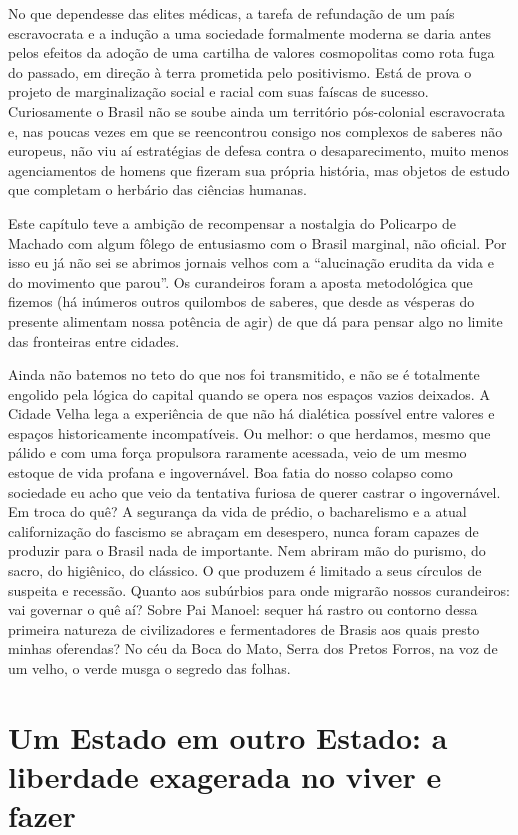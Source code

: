 No que dependesse das elites médicas, a tarefa de refundação de um país
escravocrata e a indução a uma sociedade formalmente moderna se daria
antes pelos efeitos da adoção de uma cartilha de valores cosmopolitas
como rota fuga do passado, em direção à terra prometida pelo
positivismo. Está de prova o projeto de marginalização social e racial
com suas faíscas de sucesso. Curiosamente o Brasil não se soube ainda um
território pós-colonial escravocrata e, nas poucas vezes em que se
reencontrou consigo nos complexos de saberes não europeus, não viu aí
estratégias de defesa contra o desaparecimento, muito menos
agenciamentos de homens que fizeram sua própria história, mas objetos de
estudo que completam o herbário das ciências humanas.

Este capítulo teve a ambição de recompensar a nostalgia do Policarpo de
Machado com algum fôlego de entusiasmo com o Brasil marginal, não
oficial. Por isso eu já não sei se abrimos jornais velhos com a
``alucinação erudita da vida e do movimento que parou''. Os curandeiros
foram a aposta metodológica que fizemos (há inúmeros outros quilombos de
saberes, que desde as vésperas do presente alimentam nossa potência de
agir) de que dá para pensar algo no limite das fronteiras entre cidades.

Ainda não batemos no teto do que nos foi transmitido, e não se é
totalmente engolido pela lógica do capital quando se opera nos espaços
vazios deixados. A Cidade Velha lega a experiência de que não há
dialética possível entre valores e espaços historicamente incompatíveis.
Ou melhor: o que herdamos, mesmo que pálido e com uma força propulsora
raramente acessada, veio de um mesmo estoque de vida profana e
ingovernável. Boa fatia do nosso colapso como sociedade eu acho que veio
da tentativa furiosa de querer castrar o ingovernável. Em troca do quê?
A segurança da vida de prédio, o bacharelismo e a atual californização
do fascismo se abraçam em desespero, nunca foram capazes de produzir
para o Brasil nada de importante. Nem abriram mão do purismo, do sacro,
do higiênico, do clássico. O que produzem é limitado a seus círculos de
suspeita e recessão. Quanto aos subúrbios para onde migrarão nossos
curandeiros: vai governar o quê aí? Sobre Pai Manoel: sequer há rastro
ou contorno dessa primeira natureza de civilizadores e fermentadores de
Brasis aos quais presto minhas oferendas? No céu da Boca do Mato, Serra
dos Pretos Forros, na voz de um velho, o verde musga o segredo das
folhas.

\section*{Um Estado em outro Estado: a liberdade exagerada no viver e fazer}

